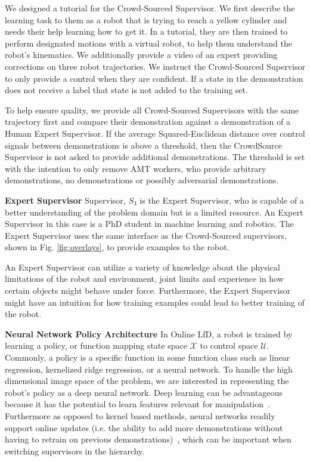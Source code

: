 \documentclass[10pt, conference]{ieeeconf}      %
\begin{document}
We  designed a tutorial for the Crowd-Sourced Supervisor. We first describe the learning task to them as a
robot that is trying to reach a yellow cylinder and needs their help learning how to get it. In a tutorial, they are then trained
to perform designated motions with a virtual robot, to help them understand  the robot's kinematics. We additionally
provide a video of an expert providing corrections on three robot trajectories. We instruct the Crowd-Sourced
Supervisor to only provide a control when they are confident. If a state in the demonstration does not receive a label that state is not added to the training set. 

To help ensure quality, we provide all Crowd-Sourced Supervisors with the same trajectory first and compare their
demonstration against a demonstration of a Human Expert Supervisor. If the average Squared-Euclidean distance over control
signals between demonstrations is above a threshold, then the CrowdSource Supervisor is not asked to provide additional demonstrations. The threshold is set with the intention to only remove  AMT workers, who provide arbitrary demonstrations, no demonstrations or possibly adversarial demonstrations.   

\noindent \textbf{Expert Supervisor} Supervisor, $S_3$ is the  Expert Supervisor, who is capable of
a better understanding of the problem domain but is a limited resource. An Expert Supervisor in this case is a PhD student in
machine learning and robotics. The Expert Supervisor uses the same
interface as the Crowd-Sourced supervisors, shown in Fig. \ref{fig:overlays}, to provide examples to the robot.  

An Expert Supervisor can utilize a variety of knowledge about the physical limitations of the robot and environment,
joint limits and experience in how certain objects might behave under force. Furthermore, the Expert Supervisor might
have an intuition for how training examples could lead to better training of the robot.

\noindent \textbf{Neural Network Policy Architecture}
In Online LfD, a  robot is trained by learning a policy, or function mapping state space $\mathcal{X}$ to control space $\mathcal{U}$. Commonly, a policy is a specific function in some function class such as linear regression, kernelized ridge regression, or a neural network. To handle the high dimensional image space of the problem, we are interested in representing the robot's policy as a deep neural network. Deep learning can be advantageous because it has the potential to learn features relevant for manipulation~\cite{levine2015end,pinto2015supersizing}. Furthermore as opposed to kernel based methods, neural networks readily support online updates (i.e. the ability to add more demonstrations without having to retrain on previous demonstrations)~\cite{scholkopf2002learning}, which can be important when switching supervisors in the hierarchy. 
\end{document}
